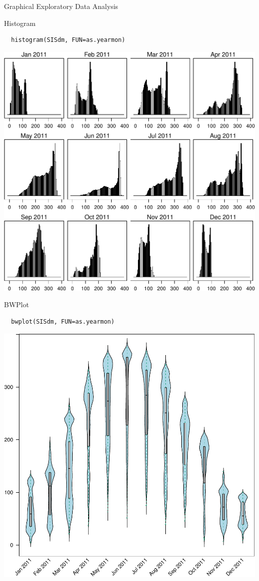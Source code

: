 \documentclass[xcolor={usenames,svgnames,dvipsnames}]{beamer}
\begin{document}
\begin{frame}[label=sec-4-6]{Graphical Exploratory Data Analysis}
\end{frame}


\begin{frame}[fragile,label=sec-4-7]{Histogram}
 \lstset{language=R,label= ,caption= ,numbers=none}
\begin{lstlisting}
  histogram(SISdm, FUN=as.yearmon)
\end{lstlisting}

\includegraphics[width=.9\linewidth]{figs/SISdm_histogram.pdf}
\end{frame}

\begin{frame}[fragile,label=sec-4-8]{BWPlot}
 \lstset{language=R,label= ,caption= ,numbers=none}
\begin{lstlisting}
  bwplot(SISdm, FUN=as.yearmon)
\end{lstlisting}

\includegraphics[width=.9\linewidth]{figs/SISdm_boxplot.pdf}
\end{frame}
\end{document}
